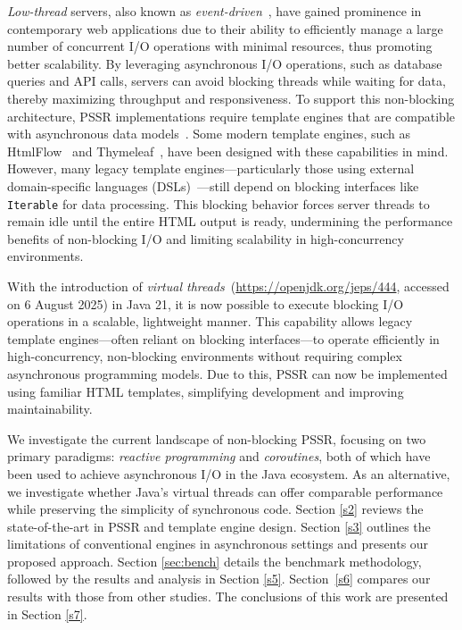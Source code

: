 \documentclass[software,article,accept,pdftex,moreauthors]{Definitions/mdpi}
\begin{document}
\textit{Low-thread} servers, also known as
\textit{event-driven}~\cite{event-driven-servers}, have gained prominence in
contemporary web applications due to their ability to efficiently manage a large
number of concurrent I/O operations with minimal resources, thus promoting
better scalability.
By leveraging asynchronous I/O operations, such as
database queries and API calls, servers can avoid blocking threads while
waiting for data, thereby maximizing throughput and responsiveness. To support
this non-blocking architecture, PSSR implementations require template engines
that are compatible with asynchronous data models~\cite{carvalho2023async}.
Some modern template engines, such as HtmlFlow~\cite{htmlflow} and Thymeleaf~\cite{thymeleaf}, have
been designed with these capabilities in mind. However, many legacy
template engines---particularly those using external domain-specific languages
(DSLs)~\cite{Fowler03}---still depend on blocking interfaces like
\texttt{Iterable} for data processing. This blocking behavior forces server
threads to remain idle until the entire HTML output is ready, undermining the
performance benefits of non-blocking I/O and limiting scalability in
high-concurrency environments.

With the introduction of \textit{virtual
    threads}~({\url{https://openjdk.org/jeps/444}}, accessed on 6 August 2025) in Java 21, it is now
possible to execute blocking I/O operations in a scalable, lightweight manner.
This capability allows legacy template engines---often reliant on blocking
interfaces---to operate efficiently in high-concurrency, non-blocking
environments without requiring complex asynchronous programming models. Due to this, PSSR can now be implemented using familiar HTML templates, simplifying
development and improving maintainability.

We investigate the current landscape of non-blocking PSSR, focusing on two
primary paradigms: \textit{reactive programming} and \textit{coroutines}, both
of which have been used to achieve asynchronous I/O in the Java ecosystem. As
an alternative, we investigate whether Java’s virtual threads can offer
comparable performance while preserving the simplicity of synchronous code.
Section \ref{s2} reviews the state-of-the-art in PSSR and template engine design.
Section \ref{s3} outlines the limitations of conventional engines in asynchronous
settings and presents our proposed approach. Section \ref{sec:bench} details the benchmark
methodology, followed by the results and analysis in Section \ref{s5}.
Section~\ref{s6} compares our results with those from other studies.
The conclusions of this work are presented in Section \ref{s7}.
\end{document}
